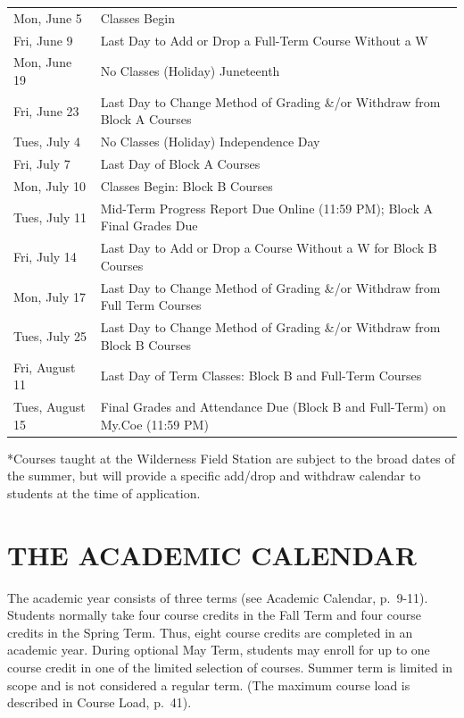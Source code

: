 \documentclass[
  letterpaper,
]{scrbook}
\renewcommand\toprule[2]\relax
\renewcommand\bottomrule[2]\relax
\begin{document}
\begin{longtable}[]{@{}
  >{\raggedright\arraybackslash}p{}
  >{\raggedleft\arraybackslash}p{}@{}}
\toprule\noalign{}
\endhead
\bottomrule\noalign{}
\endlastfoot
Mon, June 5 & Classes Begin \\
Fri, June 9 & Last Day to Add or Drop a Full-Term Course Without a W \\
Mon, June 19 & No Classes (Holiday) Juneteenth \\
Fri, June 23 & Last Day to Change Method of Grading \&/or Withdraw from
Block A Courses \\
Tues, July 4 & No Classes (Holiday) Independence Day \\
Fri, July 7 & Last Day of Block A Courses \\
Mon, July 10 & Classes Begin: Block B Courses \\
Tues, July 11 & Mid-Term Progress Report Due Online (11:59 PM); Block A
Final Grades Due \\
Fri, July 14 & Last Day to Add or Drop a Course Without a W for Block B
Courses \\
Mon, July 17 & Last Day to Change Method of Grading \&/or Withdraw from
Full Term Courses \\
Tues, July 25 & Last Day to Change Method of Grading \&/or Withdraw from
Block B Courses \\
Fri, August 11 & Last Day of Term Classes: Block B and Full-Term
Courses \\
Tues, August 15 & Final Grades and Attendance Due (Block B and
Full-Term) on My.Coe (11:59 PM) \\
\end{longtable}

*Courses taught at the Wilderness Field Station are subject to the broad
dates of the summer, but will provide a specific add/drop and withdraw
calendar to students at the time of application.

\chapter{THE ACADEMIC CALENDAR}\label{the-academic-calendar}

The academic year consists of three terms (see Academic Calendar,
p.~9-11). Students normally take four course credits in the Fall Term
and four course credits in the Spring Term. Thus, eight course credits
are completed in an academic year. During optional May Term, students
may enroll for up to one course credit in one of the limited selection
of courses. Summer term is limited in scope and is not considered a
regular term. (The maximum course load is described in Course Load,
p.~41).
\end{document}
